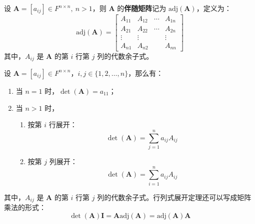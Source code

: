 \begin{definition}
    设 $\mathbf{A} = [a_{ij}] \in F^{n \times n},\ n > 1$，则 $\mathbf{A}$ 的\textbf{伴随矩阵}记为 $\mathrm{adj}(\mathbf{A})$，定义为：
    \[
        \mathrm{adj}(\mathbf{A}) = \begin{bmatrix} A_{11} & A_{12} & \cdots & A_{1 n} \\ A_{21} & A_{22} & \cdots & A_{2 n} \\ \vdots & \vdots & & \vdots \\ A_{n 1} & A_{n 2} & & A_{n n} \end{bmatrix}
    \]
    其中，$A_{ij}$ 是 $\mathbf{A}$ 的第 $i$ 行第 $j$ 列的代数余子式。
    
\end{definition}

\begin{theorem}[行列式展开定理]
    设 $\mathbf{A} = [a_{ij}] \in F^{n \times n}$，$i,j\in\{1,2,\ldots,n\}$，那么有：
    \begin{enumerate}
        \item 当 $n=1$ 时，$\det(\mathbf{A}) = a_{11}$；
        \item 当 $n>1$ 时，
        \begin{enumerate}
            \item 按第 $i$ 行展开：
            \[
                \det(\mathbf{A}) = \sum_{j=1}^{n} a_{ij} A_{ij}
            \]
            \item 按第 $j$ 列展开：
            \[
                \det(\mathbf{A}) = \sum_{i=1}^{n} a_{ij} A_{ij}
            \]
        \end{enumerate}
    \end{enumerate}
    其中，$A_{ij}$ 是 $\mathbf{A}$ 的第 $i$ 行第 $j$ 列的代数余子式。行列式展开定理还可以写成矩阵乘法的形式：
    \[
        \det(\mathbf{A}) \mathbf{I} = \mathbf{A}\mathrm{adj}(\mathbf{A})= \mathrm{adj}(\mathbf{A})\mathbf{A}
    \]
    \label{thm:determinant_expansion}
\end{theorem}

